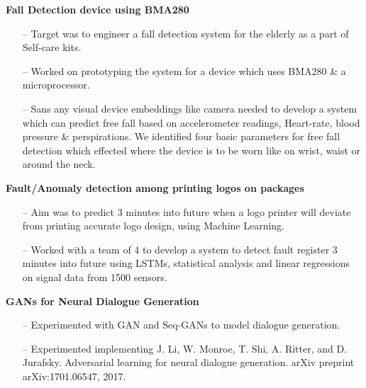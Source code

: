 \documentclass[margin,line]{templates/resume}
\newcommand{\myhref}[3][blue]{\href{#2}{\color{#1}{#3}}}
\newcommand{\compresslist}{%
\setlength{\itemsep}{3pt}%
\setlength{\parskip}{0pt}%
\setlength{\parsep}{0pt}%
}
\begin{document}
\begin{resume}
\vspace{-0.2cm}    
\textsf{\textbf{Fall Detection device using BMA280}} \hfill{\myhref[darkblue]{https://esha-singh.github.io/\#mpi}{Web}}
\vspace{0.05cm}
\begin{itemize}[leftmargin=*]\compresslist
\item[--]Target was to engineer a fall detection system for the elderly as a part of Self-care kits.
\item[--]Worked on prototyping the system for a device which uses BMA280 \& a microprocessor.
\item[--]Sans any visual device embeddings like camera needed to develop a system which can predict free fall based on accelerometer readings, Heart-rate, blood pressure \& perspirations. We identified four basic parameters for free fall detection which effected where the device is to be worn like on wrist, waist or around the neck.
\end{itemize}

\vspace{-0.2cm}    
\textsf{\textbf{Fault/Anomaly detection among printing logos on packages}} \hfill{\myhref[darkblue]{https://esha-singh.github.io/\#mpi}{Web}}
\normalsize
\vspace{0.05cm}
\begin{itemize}[leftmargin=*]\compresslist
  \item[--] Aim was to predict 3 minutes into future when a logo printer will deviate from printing accurate logo design, using Machine Learning.
\item[--] Worked with a team of 4 to develop a system to detect fault register 3 minutes into future using LSTMs, statistical analysis and linear regressions on signal data from 1500 sensors. 
\end{itemize}

\vspace{-0.2cm}    
\textsf{\textbf{GANs for Neural Dialogue Generation}} \hfill{\myhref[darkblue]{https://esha-singh.github.io/\#mpi}{Web}}
\normalsize
\vspace{0.05cm}
\begin{itemize}[leftmargin=*]\compresslist
  \item[--]Experimented with GAN and Seq-GANs to model dialogue generation.  
\item[--] Experimented implementing J. Li, W. Monroe, T. Shi, A. Ritter, and D. Jurafsky. Adversarial learning for neural dialogue generation. arXiv preprint arXiv:1701.06547, 2017.
\end{itemize}


\end{resume}
\end{document}
